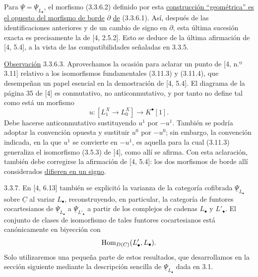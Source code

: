 Para $\underline\Psi=\underline\Psi_{L_\bullet}$, el morfismo
(3.3.6.2) definido por esta \underline{construcción ``geométrica'' es
el opuesto del morfismo de borde} $\partial$ \underline{de} (3.3.6.1).
Así, después de las identificaciones anteriores y de un cambio de
signo en $\partial$, esta última sucesión exacta es precisamente la de
[4, 2.5.2]. Esto se deduce de la última afirmación de [4, 5.4], a la
vista de las compatibilidades señaladas en 3.3.5.

\underline{Observación} 3.3.6.3. Aprovechamos la ocasión para aclarar
un punto de [4, n.º 3.11] relativo a los isomorfismos fundamentales
(3.11.3) y (3.11.4), que desempeñan un papel esencial en la
demostración de [4, 5.4]. El diagrama de la página 35 de [4] es
conmutativo, no anticonmutativo, y por tanto no define tal como está un
morfismo
\[
 u:[L^X_1\longrightarrow L^X_0]\longrightarrow K^\bullet[1].
\]
Debe hacerse anticonmutativo sustituyendo $u^1$ por $-u^1$. También se
podría adoptar la convención opuesta y sustituir $u^0$ por $-u^0$;
sin embargo, la convención indicada, en la que $u^1$ se convierte en
$-u^1$, es aquella para la cual (3.11.3) generaliza el isomorfismo
(3.5.3) de [4], como allí se afirma. Con esta aclaración, también debe
corregirse la afirmación de [4, 5.4]: los dos morfismos de borde allí
considerados \underline{difieren en un signo}.

3.3.7. En [4, 6.13] también se explicitó la varianza de la categoría
cofibrada $\underline\Psi_{L_\bullet}$ sobre $\underline C$ al variar
$L_\bullet$, reconstruyendo, en particular, la categoría de funtores
cocartesianos de $\underline\Psi_{L_\bullet}$ a
$\underline\Psi_{L'_\bullet}$ a partir de los complejos de cadenas
$L_\bullet$ y $L'_\bullet$. El conjunto de clases de isomorfismo de
tales funtores cocartesianos está canónicamente en biyección con
\[
 \operatorname{Hom}_{D(C)}(L'_\bullet,L_\bullet).
\]
Solo utilizaremos una pequeña parte de estos resultados, que
desarrollamos en la sección siguiente mediante la descripción sencilla
de $\underline\Psi_{L_\bullet}$ dada en 3.1.
